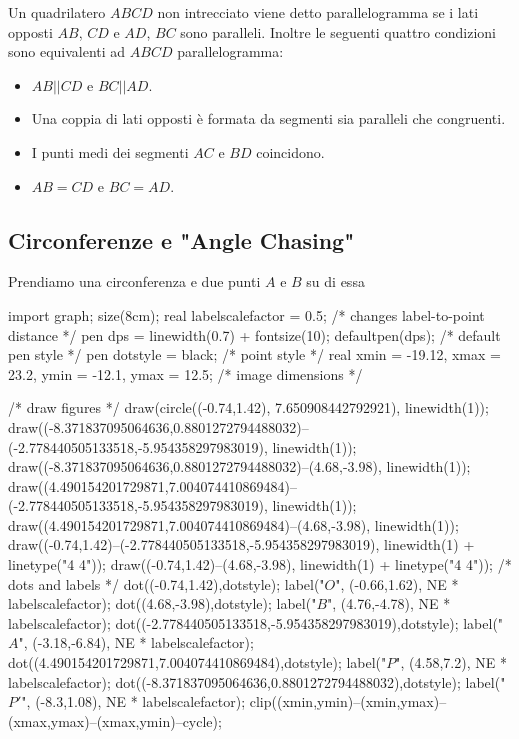 \documentclass[11pt]{scrartcl}
\begin{document}
	
	\begin{fact}
		Un quadrilatero $ABCD$ non intrecciato viene detto parallelogramma se i lati opposti $AB$, $CD$ e $AD$, $BC$ sono paralleli. Inoltre le seguenti quattro condizioni sono equivalenti ad $ABCD$ parallelogramma:
		\begin{itemize}
			\item $AB||CD$ e $BC||AD$.
			\item Una coppia di lati opposti è formata da segmenti sia paralleli che congruenti. 
			\item I punti medi dei segmenti $AC$ e $BD$ coincidono.
			\item $AB=CD$ e $BC=AD$.
		\end{itemize}
	\end{fact}
	
	\subsection{Circonferenze e "Angle Chasing"}
	Prendiamo una circonferenza e due punti $A$ e $B$ su di essa
	
	\begin{center}
		\begin{asy}
		import graph; size(8cm); 
		real labelscalefactor = 0.5; /* changes label-to-point distance */
		pen dps = linewidth(0.7) + fontsize(10); defaultpen(dps); /* default pen style */ 
		pen dotstyle = black; /* point style */ 
		real xmin = -19.12, xmax = 23.2, ymin = -12.1, ymax = 12.5;  /* image dimensions */
		
		/* draw figures */
		draw(circle((-0.74,1.42), 7.650908442792921), linewidth(1)); 
		draw((-8.371837095064636,0.8801272794488032)--(-2.778440505133518,-5.954358297983019), linewidth(1)); 
		draw((-8.371837095064636,0.8801272794488032)--(4.68,-3.98), linewidth(1)); 
		draw((4.490154201729871,7.004074410869484)--(-2.778440505133518,-5.954358297983019), linewidth(1)); 
		draw((4.490154201729871,7.004074410869484)--(4.68,-3.98), linewidth(1)); 
		draw((-0.74,1.42)--(-2.778440505133518,-5.954358297983019), linewidth(1) + linetype("4 4")); 
		draw((-0.74,1.42)--(4.68,-3.98), linewidth(1) + linetype("4 4")); 
		/* dots and labels */
		dot((-0.74,1.42),dotstyle); 
		label("$O$", (-0.66,1.62), NE * labelscalefactor); 
		dot((4.68,-3.98),dotstyle); 
		label("$B$", (4.76,-4.78), NE * labelscalefactor); 
		dot((-2.778440505133518,-5.954358297983019),dotstyle); 
		label("$A$", (-3.18,-6.84), NE * labelscalefactor); 
		dot((4.490154201729871,7.004074410869484),dotstyle); 
		label("$P$", (4.58,7.2), NE * labelscalefactor); 
		dot((-8.371837095064636,0.8801272794488032),dotstyle); 
		label("$P'$", (-8.3,1.08), NE * labelscalefactor); 
		clip((xmin,ymin)--(xmin,ymax)--(xmax,ymax)--(xmax,ymin)--cycle); 
		\end{asy}
	\end{center}
	
\end{document}
